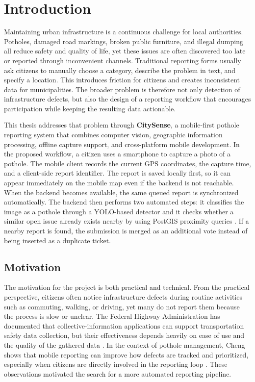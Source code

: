 \chapter{Introduction}

Maintaining urban infrastructure is a continuous challenge for local authorities. Potholes, damaged road markings, broken public furniture, and illegal dumping all reduce safety and quality of life, yet these issues are often discovered too late or reported through inconvenient channels. Traditional reporting forms usually ask citizens to manually choose a category, describe the problem in text, and specify a location. This introduces friction for citizens and creates inconsistent data for municipalities. The broader problem is therefore not only detection of infrastructure defects, but also the design of a reporting workflow that encourages participation while keeping the resulting data actionable.

This thesis addresses that problem through \textbf{CitySense}, a mobile-first pothole reporting system that combines computer vision, geographic information processing, offline capture support, and cross-platform mobile development. In the proposed workflow, a citizen uses a smartphone to capture a photo of a pothole. The mobile client records the current GPS coordinates, the capture time, and a client-side report identifier. The report is saved locally first, so it can appear immediately on the mobile map even if the backend is not reachable. When the backend becomes available, the same queued report is synchronized automatically. The backend then performs two automated steps: it classifies the image as a pothole through a YOLO-based detector \cite{jocher2023ultralytics} and it checks whether a similar open issue already exists nearby by using PostGIS proximity queries \cite{obe2021postgis}. If a nearby report is found, the submission is merged as an additional vote instead of being inserted as a duplicate ticket.

\section{Motivation}

The motivation for the project is both practical and technical. From the practical perspective, citizens often notice infrastructure defects during routine activities such as commuting, walking, or driving, yet many do not report them because the process is slow or unclear. The Federal Highway Administration has documented that collective-information applications can support transportation safety data collection, but their effectiveness depends heavily on ease of use and the quality of the gathered data \cite{fhwa2022collective}. In the context of pothole management, Cheng shows that mobile reporting can improve how defects are tracked and prioritized, especially when citizens are directly involved in the reporting loop \cite{cheng2024potholeprogram}. These observations motivated the search for a more automated reporting pipeline.

